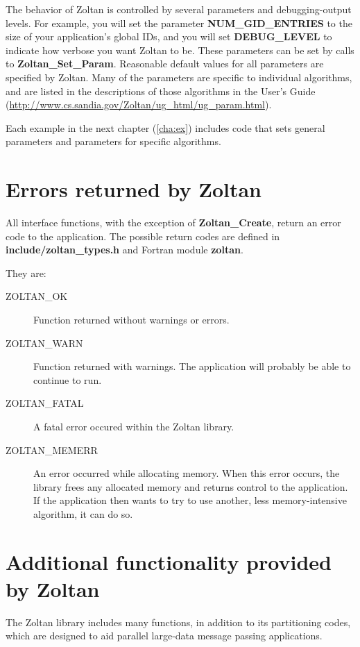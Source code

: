The behavior of Zoltan is controlled by several parameters and debugging-output
levels.
For example, you will set the parameter \textbf{NUM\_GID\_ENTRIES} to the
size of your application's global IDs, and you will set \textbf{DEBUG\_LEVEL}
to indicate how verbose you want Zoltan to be.
These parameters can be set by calls to \textbf{Zoltan\_Set\_Param}. Reasonable
default values for all parameters are specified by Zoltan. Many of the parameters
are specific to individual algorithms, and are listed in the descriptions of those
algorithms in the User's Guide
(\url{http://www.cs.sandia.gov/Zoltan/ug\_html/ug\_param.html}).

Each example in the next chapter (\ref{cha:ex}) includes code that sets
general parameters and parameters for specific algorithms.

\section{Errors returned by Zoltan}

All interface functions, with the exception of \textbf{Zoltan\_Create}, return an
error code to the application. The possible return codes are defined in
\textbf{include/zoltan\_types.h} and Fortran module \textbf{zoltan}.

They are:

\begin{description}
\item [ZOLTAN\_OK] Function returned without warnings or errors.
\item [ZOLTAN\_WARN] Function returned with warnings. The application will probably be able to continue to run.
\item [ZOLTAN\_FATAL] A fatal error occured within the Zoltan library.
\item [ZOLTAN\_MEMERR] An error occurred while allocating memory. When this error occurs, the library frees any allocated memory and returns control to the application. If the application then wants to try to use another, less memory-intensive algorithm, it can do so.
\end{description}

\section{Additional functionality provided by Zoltan}

The Zoltan library includes many functions, in addition to its
partitioning codes, which are designed to aid parallel
large-data message passing applications.

